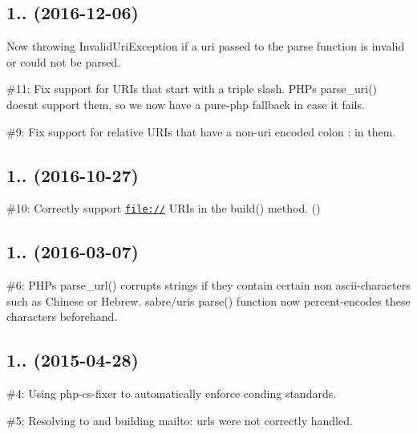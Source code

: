 \subsection*{1.. (2016-\/12-\/06) }


\begin{DoxyItemize}
\item Now throwing {\ttfamily Invalid\+Uri\+Exception} if a uri passed to the {\ttfamily parse} function is invalid or could not be parsed.
\item \#11\+: Fix support for U\+R\+Is that start with a triple slash. P\+HP\textquotesingle{}s {\ttfamily parse\+\_\+uri()} doesn\textquotesingle{}t support them, so we now have a pure-\/php fallback in case it fails.
\item \#9\+: Fix support for relative U\+RI\textquotesingle{}s that have a non-\/uri encoded colon {\ttfamily \+:} in them.
\end{DoxyItemize}

\subsection*{1.. (2016-\/10-\/27) }


\begin{DoxyItemize}
\item \#10\+: Correctly support \href{file://}{\tt file\+://} U\+R\+Is in the build() method. ()
\end{DoxyItemize}

\subsection*{1.. (2016-\/03-\/07) }


\begin{DoxyItemize}
\item \#6\+: P\+HP\textquotesingle{}s {\ttfamily parse\+\_\+url()} corrupts strings if they contain certain non ascii-\/characters such as Chinese or Hebrew. sabre/uri\textquotesingle{}s {\ttfamily parse()} function now percent-\/encodes these characters beforehand.
\end{DoxyItemize}

\subsection*{1.. (2015-\/04-\/28) }


\begin{DoxyItemize}
\item \#4\+: Using php-\/cs-\/fixer to automatically enforce conding standards.
\item \#5\+: Resolving to and building {\ttfamily mailto\+:} urls were not correctly handled.
\end{DoxyItemize}

